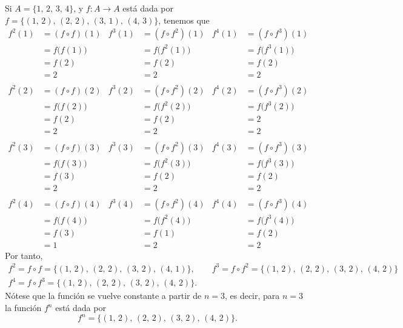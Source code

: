 \begin{myexample}
    Si $A = \{ 1, \, 2, \, 3, \, 4 \}$, y $f:A \longrightarrow A$ está dada por $f = \{ (1, \, 2), \, (2, \, 2), \, (3, \, 1), \, (4, \, 3) \}$, tenemos que
    \begin{align*}
        f^2(1) & = (f \circ f)(1) & f^3(1) & = \left(f \circ f^2\right)(1) & f^4(1) & = \left(f \circ f^3\right)(1) \\
        & = f\big(f(1)\big) & & = f\big(f^2(1)\big) & & = f\big(f^3(1)\big) \\
        & = f(2) & & = f(2) & & = f(2) \\
        & = 2 & & = 2 & & = 2 \\
        \\
        f^2(2) & = (f \circ f)(2) & f^3(2) & = \left(f \circ f^2\right)(2) & f^4(2) & = \left(f \circ f^3\right)(2) \\
        & = f\big(f(2)\big) & & = f\big(f^2(2)\big) & & = f\big(f^3(2)\big) \\
        & = f(2) & & = f(2) & & = 2 \\
        & = 2 & & = 2 & & = 2 \\
        \\
        f^2(3) & = (f \circ f)(3) & f^3(3) & = \left(f \circ f^2\right)(3) & f^4(3) & = \left(f \circ f^3\right)(3) \\
        & = f\big(f(3)\big) & & = f\big(f^2(3)\big) & & = f\big(f^3(3)\big) \\
        & = f(3) & & = f(2) & & = f(2) \\
        & = 2 & & = 2 & & = 2 \\
        \\
        f^2(4) & = (f \circ f)(4) & f^3(4) & = \left(f \circ f^2\right)(4) & f^4(4) & = \left(f \circ f^3\right)(4) \\
        & = f\big(f(4)\big) & & = f\big(f^2(4)\big) & & = f\big(f^3(4)\big) \\
        & = f(3) & & = f(1) & & = f(2) \\
        & = 1 & & = 2 & & = 2
    \end{align*}
    Por tanto,
    \begin{gather*}
        f^2 = f \circ f = \{ (1, \, 2), \, (2, \, 2), \, (3, \, 2), \, (4, \, 1) \}, \quad \quad f^3 = f \circ f^2 = \{ (1, \, 2), \, (2, \, 2), \, (3, \, 2), \, (4, \, 2) \} \\[7pt]
        f^4 = f \circ f^3 = \{ (1, \, 2), \, (2, \, 2), \, (3, \, 2), \, (4, \, 2) \}.
    \end{gather*}
    Nótese que la función se vuelve constante a partir de $n = 3$, es decir, para $n = 3$ la función $f^n$ está dada por
    $$f^n = \{ (1, \, 2), \, (2, \, 2), \, (3, \, 2), \, (4, \, 2) \}.$$
\end{myexample}

